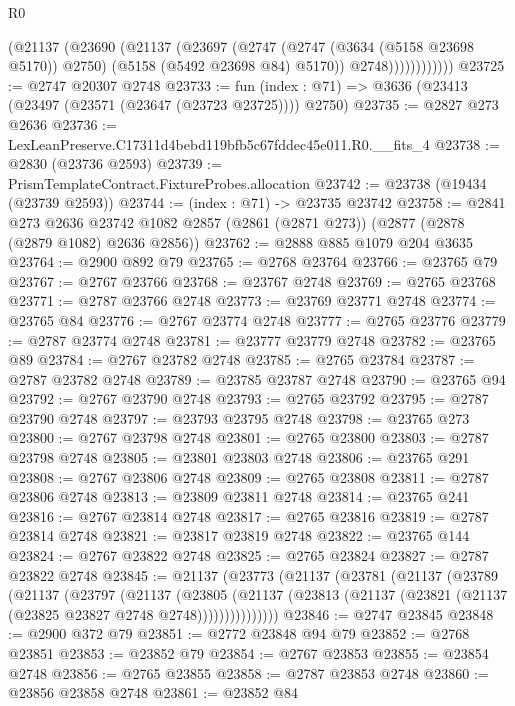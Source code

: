\begin{lexlean}{R0}
\begin{coremodule}
                    (@21137
                      (@23690
                        (@21137
                          (@23697
                            (@2747
                              (@2747 (@3634 (@5158 @23698 @5170)) @2750)
                              (@5158 (@5492 @23698 @84) @5170))
                            @2748))))))))))))
@23725 := @2747 @20307 @2748
@23733 := fun (index : @71) => @3636 (@23413 (@23497 (@23571 (@23647 (@23723 @23725)))) @2750)
@23735 := @2827 @273 @2636
@23736 := LexLeanPreserve.C17311d4bebd119bfb5c67fddec45e011.R0.__fits_4
@23738 := @2830 (@23736 @2593)
@23739 := PrismTemplateContract.FixtureProbes.allocation
@23742 := @23738 (@19434 (@23739 @2593))
@23744 := (index : @71) -> @23735 @23742
@23758 := @2841
    @273
    @2636
    @23742
    @1082
    @2857
    (@2861 (@2871 @273))
    (@2877 (@2878 (@2879 @1082) @2636 @2856))
@23762 := @2888 @885 @1079 @204 @3635
@23764 := @2900 @892 @79
@23765 := @2768 @23764
@23766 := @23765 @79
@23767 := @2767 @23766
@23768 := @23767 @2748
@23769 := @2765 @23768
@23771 := @2787 @23766 @2748
@23773 := @23769 @23771 @2748
@23774 := @23765 @84
@23776 := @2767 @23774 @2748
@23777 := @2765 @23776
@23779 := @2787 @23774 @2748
@23781 := @23777 @23779 @2748
@23782 := @23765 @89
@23784 := @2767 @23782 @2748
@23785 := @2765 @23784
@23787 := @2787 @23782 @2748
@23789 := @23785 @23787 @2748
@23790 := @23765 @94
@23792 := @2767 @23790 @2748
@23793 := @2765 @23792
@23795 := @2787 @23790 @2748
@23797 := @23793 @23795 @2748
@23798 := @23765 @273
@23800 := @2767 @23798 @2748
@23801 := @2765 @23800
@23803 := @2787 @23798 @2748
@23805 := @23801 @23803 @2748
@23806 := @23765 @291
@23808 := @2767 @23806 @2748
@23809 := @2765 @23808
@23811 := @2787 @23806 @2748
@23813 := @23809 @23811 @2748
@23814 := @23765 @241
@23816 := @2767 @23814 @2748
@23817 := @2765 @23816
@23819 := @2787 @23814 @2748
@23821 := @23817 @23819 @2748
@23822 := @23765 @144
@23824 := @2767 @23822 @2748
@23825 := @2765 @23824
@23827 := @2787 @23822 @2748
@23845 := @21137
    (@23773
      (@21137
        (@23781
          (@21137
            (@23789
              (@21137
                (@23797
                  (@21137
                    (@23805
                      (@21137
                        (@23813 (@21137 (@23821 (@21137 (@23825 @23827 @2748 @2748)))))))))))))))
@23846 := @2747 @23845
@23848 := @2900 @372 @79
@23851 := @2772 @23848 @94 @79
@23852 := @2768 @23851
@23853 := @23852 @79
@23854 := @2767 @23853
@23855 := @23854 @2748
@23856 := @2765 @23855
@23858 := @2787 @23853 @2748
@23860 := @23856 @23858 @2748
@23861 := @23852 @84

\end{coremodule}
\end{lexlean}
